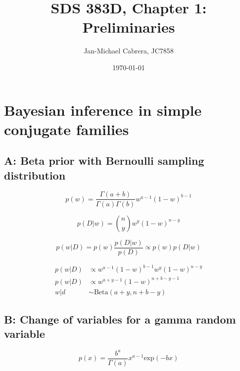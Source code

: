 \documentclass[12pt]{article}%
\begin{document}
      \title{SDS 383D, Chapter 1: Preliminaries}
      \author{Jan-Michael Cabrera, JC7858}
      \date{\today}
      \maketitle

      \section*{Bayesian inference in simple conjugate families}

      \subsection*{A: Beta prior with Bernoulli sampling distribution}

            \begin{equation}\label{eq:prior}
                  p(w) = \frac{\Gamma(a+b)}{\Gamma(a)\Gamma(b)}w^{a-1}(1-w)^{b-1}
            \end{equation}

            \begin{equation}\label{eq:likelihood}
                  p(D|w) = \binom{n}{y} w^y (1 - w)^{n-y}
            \end{equation}

            \begin{equation}\label{eq:posterior_1}
                  p(w|D) = p(w) \frac{p(D|w)}{p(D)} \propto p(w) p(D|w)
            \end{equation}

            \begin{align}
                  p(w|D) &\propto w^{a-1}(1-w)^{b-1}w^y(1-w)^{n-y} \\
                  p(w|D) &\propto w^{a+y-1}(1-w)^{n+b-y-1} \\
                  w|d &\sim \text{Beta}(a+y, n+b-y)
            \end{align}


      \subsection*{B: Change of variables for a gamma random variable}

            \begin{equation}\label{eq:gamma}
                  p(x) = \frac{b^a}{\Gamma(a)}x^{a-1} \text{exp}(-bx)
            \end{equation}
\end{document}
